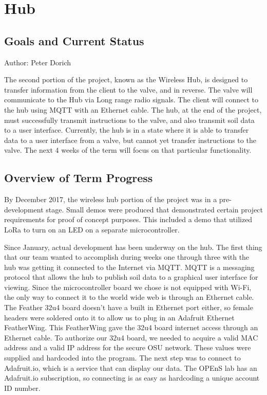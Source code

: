\documentclass[onecolumn, draftclsnofoot,10pt, compsoc]{IEEEtran}
\begin{document}
    
    \section{Hub}
    \subsection{  Goals and Current Status  }
    Author: Peter Dorich
    
    
    The second portion of the project, known as the Wireless Hub, is designed to transfer information from the client to the valve, and in reverse.
    The valve will communicate to the Hub via Long range radio signals. 
    The client will connect to the hub using MQTT with an Ethernet cable.
    The hub, at the end of the project, must successfully transmit instructions to the valve, and also transmit soil data to a user interface. 
    Currently, the hub is in a state where it is able to transfer data to a user interface from a valve, but cannot yet transfer instructions to the valve. 
    The next 4 weeks of the term will focus on that particular functionality. 
    \subsection{Overview of Term Progress}
    By December 2017, the wireless hub portion of the project was in a pre-development stage.
    Small demos were produced that demonstrated certain project requirements for proof of concept purposes. This included a demo that utilized LoRa to turn on an LED on a separate microcontroller.
    
    
	Since January, actual development has been underway on the hub. 
    The first thing that our team wanted to accomplish during weeks one through three with the hub was getting it connected to the Internet via MQTT.
    MQTT is a messaging protocol that allows the hub to publish soil data to a graphical user interface for viewing.
    Since the microcontroller board we chose is not equipped with Wi-Fi, the only way to connect it to the world wide web is through an Ethernet cable.
    The Feather 32u4 board doesn’t have a built in Ethernet port either, so female headers were soldered onto it to allow us to plug in an Adafruit Ethernet FeatherWing.
    This FeatherWing gave the 32u4 board internet access through an Ethernet cable.
    To authorize our 32u4 board, we needed to acquire a valid MAC address and a valid IP address for the secure OSU network.
    These values were supplied and hardcoded into the program. 
    The next step was to connect to Adafruit.io, which is a service that can display our data.
    The OPEnS lab has an Adafruit.io subscription, so connecting is as easy as hardcoding a unique account ID number. 
    
\end{document}
